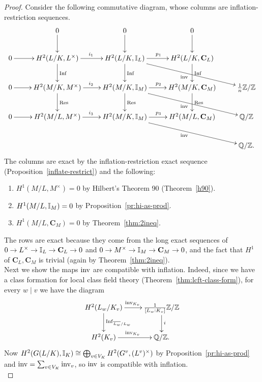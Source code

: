\begin{proof}
Consider the following commutative diagram, whose columns are inflation-restriction sequences.
\[
\xymatrix{
& 0\ar[d] & 0\ar[d] & 0\ar[d]&\\
0\ar[r] & H^2(L/K,L^{\times}) \ar[r]^{i_1} \ar[d]^{\Inf} & H^2(L/K, \I_L) \ar[r]^{p_1} \ar[d]^{\Inf}\ar[rrd]_{\inv} & H^2(L/K,\mathbf C_L) \ar[d]^{\Inf}&\\
0\ar[r] & H^2(M/K,M^{\times}) \ar[r]^{i_2}\ar[d]^{\Res} & H^2(M/K,\I_M)\ar[r]^{p_2}\ar[d]^{\Res}\ar[rrd]_{\inv} & H^2(M/K,\mathbf C_M)\ar[d]^{\Res} & \rc n\Z/\Z\\
0\ar[r] & H^2(M/L,M^{\times}) \ar[r]^{i_3} & H^2(M/K,\I_M)\ar[rrd]_{\inv}\ar[r]^{p_3} & H^2(M/L,\mathbf C_M) & \Q/\Z\\
&&&&\Q/\Z.
}
\]
The columns are exact by the inflation-restriction exact sequence (Proposition~\ref{inflate-restrict}) and the following:
\begin{enumerate}
\item
$H^1(M/L,M^{\times})=0$ by Hilbert's Theorem 90 (Theorem~\ref{h90}).
\item
$H^1(M/L, \mathbb{I}_M)=0$ by Proposition~\ref{pr:hi-as-prod}.
\item
$H^1(M/L,\mathbf C_M)=0$ by Theorem~\ref{thm:2ineq}.
\end{enumerate}
The rows are exact because they come from the long exact sequences of $0\to L^{\times}\to \mathbb{I}_L\to \mathbf C_L\to 0$ and $0\to M^{\times}\to \mathbb{I}_M\to\mathbf C_M\to 0$, and the fact that $H^1$ of $\mathbf C_L,\mathbf C_M$ is trivial (again by Theorem~\ref{thm:2ineq}).\\

 Next we show the maps $\operatorname{inv}$ are compatible with inflation. Indeed, since we have a class formation for local class field theory (Theorem~\ref{thm:lcft-class-form}), for every $w\mid v$ we have the diagram %
\[
\xymatrix{
H^2(L_w/K_v)\ar[r]^{\inv_{K_v}}\ar[d]^{\Inf_{\ol {L_w}/L_w}} & \rc{[L_w:K_v]}\Z/\Z\ar[d]^{i} \\
H^2(K_v)\ar[r]^{\inv_{K_v}} & \Q/\Z.
}
\]
Now $H^2(G(L/K),\mathbb{I}_K)\cong \bigoplus_{v\in V_{K}} H^2(G^v,(L^v)^{\times})$ by Proposition~\ref{pr:hi-as-prod} and $\operatorname{inv}=\sum_{v\in V_K}\operatorname{inv}_v$, so $\operatorname{inv}$ is compatible with inflation.\\


\end{proof}
